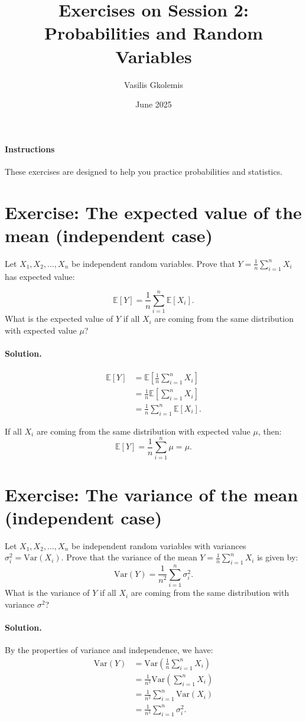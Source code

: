 \documentclass[11pt]{article}
\title{Exercises on Session 2: Probabilities and Random Variables}
\author{Vasilis Gkolemis}
\date{June 2025}
\newif\ifshowanswers
\begin{document}
\maketitle

\paragraph{Instructions}
These exercises are designed to help you practice probabilities and statistics.

\section{Exercise: The expected value of the mean (independent case)}
Let \(X_1, X_2, \ldots, X_n\) be independent random variables. Prove that $Y = \frac{1}{n} \sum_{i=1}^n X_i$ has expected value:

\[
  \mathbb{E}[Y] = \frac{1}{n} \sum_{i=1}^n \mathbb{E}[X_i].
\]
What is the expected value of \(Y\) if all \(X_i\) are coming from the same distribution with expected value \(\mu\)?


\ifshowanswers
  \paragraph{Solution.}

\begin{align*}
  \mathbb{E}[Y] &= \mathbb{E}\left[\frac{1}{n} \sum_{i=1}^n X_i\right] \\
                &= \frac{1}{n} \mathbb{E}\left[\sum_{i=1}^n X_i\right] \\
                &= \frac{1}{n} \sum_{i=1}^n \mathbb{E}[X_i].
\end{align*}

If all \(X_i\) are coming from the same distribution with expected value \(\mu\), then:
\[
  \mathbb{E}[Y] = \frac{1}{n} \sum_{i=1}^n \mu = \mu.
\]
\section{Exercise: The variance of the mean (independent case)}
Let \(X_1, X_2, \ldots, X_n\) be independent random variables with variances \(\sigma_i^2 = \text{Var}(X_i)\). Prove that the variance of the mean \(Y = \frac{1}{n} \sum_{i=1}^n X_i\) is given by:
\[
  \text{Var}(Y) = \frac{1}{n^2} \sum_{i=1}^n \sigma_i^2.
\]
What is the variance of \(Y\) if all \(X_i\) are coming from the same distribution with variance \(\sigma^2\)?
\paragraph{Solution.}
By the properties of variance and independence, we have:
\begin{align*}
  \text{Var}(Y) &= \text{Var}\left(\frac{1}{n} \sum_{i=1}^n X_i\right) \\
                &= \frac{1}{n^2} \text{Var}\left(\sum_{i=1}^n X_i\right) \\
                &= \frac{1}{n^2} \sum_{i=1}^n \text{Var}(X_i) \\
                &= \frac{1}{n^2} \sum_{i=1}^n \sigma_i^2.
\end{align*}
\end{document}
